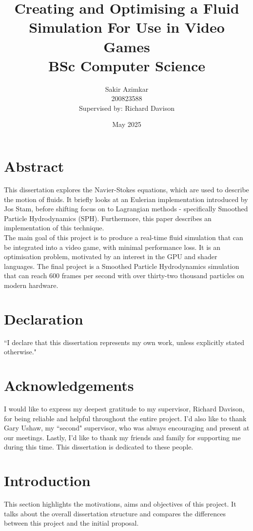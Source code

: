 \documentclass[12pt]{article}
\title
{
    {\Huge Creating and Optimising a Fluid Simulation For Use in Video Games} \\
    \vspace*{1cm}
    {\LARGE BSc Computer Science}
}
\author
{
    \vspace*{0.1cm}\huge Sakir Azimkar \\
    \vspace*{1cm}\huge 200823588 \\
    \large Supervised by: Richard Davison
}
\date{May 2025}
\begin{document}
    \maketitle
    \thispagestyle{empty}

    \newpage

    \section*{Abstract}
    This dissertation explores the Navier-Stokes equations, which are used to describe the motion of fluids. It briefly looks at an Eulerian implementation introduced by Jos Stam\cite{stam}, before shifting focus on to Lagrangian methods - specifically Smoothed Particle Hydrodynamics (SPH). Furthermore, this paper describes an implementation of this technique. \\ The main goal of this project is to produce a real-time fluid simulation that can be integrated into a video game, with minimal performance loss. It is an optimisation problem, motivated by an interest in the GPU and shader languages. The final project is a Smoothed Particle Hydrodynamics simulation that can reach 600 frames per second with over thirty-two thousand particles on modern hardware.
    
    \newpage

    \section*{Declaration} ``I declare that this dissertation represents my own work, unless explicitly stated otherwise."

    \newpage

    \section*{Acknowledgements}
    I would like to express my deepest gratitude to my supervisor, Richard Davison, for being reliable and helpful throughout the entire project. I'd also like to thank Gary Ushaw, my ``second" supervisor, who was always encouraging and present at our meetings. Lastly, I'd like to thank my friends and family for supporting me during this time. This dissertation is dedicated to these people.
    
    \newpage
    \tableofcontents
    \newpage
    \listoffigures
    \newpage

    \section{Introduction}
    \label{sec:introduction}
    This section highlights the motivations, aims and objectives of this project. It talks about the overall dissertation structure and compares the differences between this project and the initial proposal.
    
\end{document}
